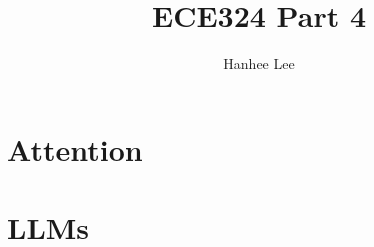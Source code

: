 \documentclass{article}
\title{ECE324 Part 4}
\author{Hanhee Lee}
\begin{document}
\section{Attention}

\newpage

\section{LLMs}

\end{document}
